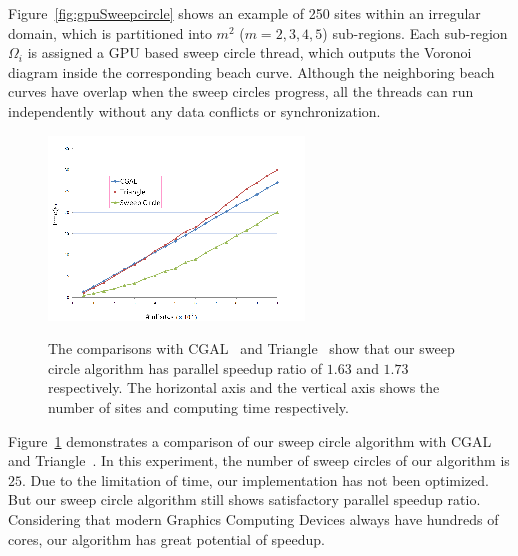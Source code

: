 {{Figure~\ref{fig:gpuSweepcircle} shows an example of 250 sites within
an irregular domain, which is partitioned into $m^2$ ($m=2,3,4,5$)
sub-regions. Each sub-region $\Omega_i$ is assigned a GPU based
sweep circle thread, which outputs the Voronoi diagram inside the
corresponding beach curve. Although the neighboring beach curves
have overlap when the sweep circles progress, all the threads can
run independently without any data conflicts or synchronization.
\iftrue
\begin{figure}[!htbp]
\vspace{-3mm}
\begin{center}
\includegraphics[width=0.9\columnwidth]{figs/sweepcircle/timeCompare.png}\\
\end{center}
\vspace{-0.1in}\caption{The comparisons with CGAL~\cite{cgal} and
Triangle~\cite{Shewchuk:1996} show that our sweep circle algorithm has
parallel speedup ratio of $1.63$ and $1.73$ respectively. The
horizontal axis and the vertical axis shows the number of sites
and computing time respectively.} \label{fig:Comparison}
\vspace{-3mm}
\end{figure}
\fi
Figure~\ref{fig:Comparison} demonstrates a comparison of our sweep circle
algorithm with CGAL~\cite{cgal} and Triangle~\cite{DBLP:conf/wacg/Shewchuk96}. In
this experiment, the number of sweep circles of our algorithm is $25$.
Due to the limitation of time, our implementation has not been optimized.
But our sweep circle algorithm still shows satisfactory parallel speedup
ratio. Considering that modern Graphics Computing Devices always have
hundreds of cores, our algorithm has great potential of speedup.

}}
